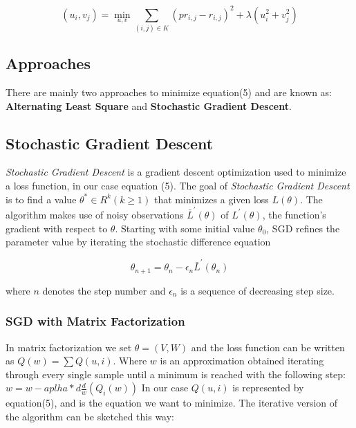 \documentclass{sig-alternate-05-2015}
\begin{document}
\begin{equation}
    {(u_{i},v_{j}) = \min_{u,v} {\sum\limits_{(i,j) \in K} {(pr_{i,j} - r_{i,j})}^{2} + \lambda(u_{i}^{2} + v_{j}^{2}) }}
\end{equation}


\subsection{Approaches}
There are mainly two approaches to minimize equation(5) and are known as:\\
\textbf{Alternating Least Square} and \textbf{Stochastic Gradient Descent}.

\subsection{Stochastic Gradient Descent}

\textit{Stochastic Gradient Descent} is a gradient descent optimization used
to minimize a loss function, in our case equation (5).
The goal of \textit{Stochastic Gradient Descent} is to find a value
$\theta^{*} \in R^{k} (k \geq 1) $ that minimizes a given loss $L(\theta)$.
The algorithm makes use of noisy observations $\bar{L}^{\prime}(\theta)$
of $L^{\prime}(\theta)$, the function's gradient with respect to $\theta$.
Starting with some initial value $\theta_{0}$, SGD refines the parameter
value by iterating the stochastic difference equation \cite{gemulla}

\begin{equation}
    {\theta_{n+1} = \theta_{n} - \epsilon_{n} \bar{L}^{\prime}(\theta_{n})}
\end{equation}

where $n$ denotes the step number and $\epsilon_{n}$ is a sequence of
decreasing step size.

\subsubsection{SGD with Matrix Factorization}

In matrix factorization we set $\theta = (V,W)$ and the loss function
can be written as $ Q(w) = {\sum Q(u,i)}$. Where $w$ is an approximation
obtained iterating through every single sample until a minimum is reached with
the following step: $w= w - aplha * d{\frac dw}(Q_{i}(w)) $
In our case $Q(u,i)$ is represented by equation(5), and is the equation
we want to minimize.
The iterative version of the algorithm can be sketched this way:\cite{mahout}\\
\end{document}
